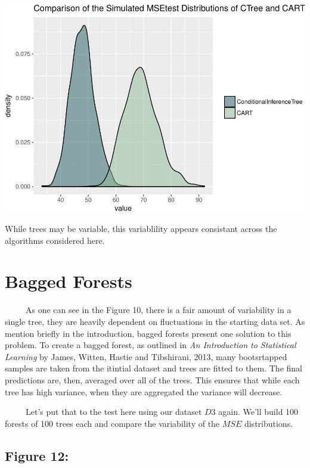\documentclass[12pt,twoside]{reedthesis}
\begin{document}
  \begin{center}\includegraphics{Thesis_files/figure-latex/fig11-1} \end{center}
  
  While trees may be variable, this variablility appears consistant across
  the algorithms considered here.
  
  \section{Bagged Forests}\label{bagged-forests}
  
  ~~~~~As one can see in the Figure 10, there is a fair amount of
  variability in a single tree, they are heavily dependent on fluctuations
  in the starting data set. As mention briefly in the introduction, bagged
  forests present one solution to this problem. To create a bagged forest,
  as outlined in \emph{An Introduction to Statistical Learning} by James,
  Witten, Hastie and Tibshirani, 2013, many bootsrtapped samples are taken
  from the itintial dataset and trees are fitted to them. The final
  predictions are, then, averaged over all of the trees. This ensures that
  while each tree has high variance, when they are aggregated the variance
  will decrease.
  
  ~~~~~Let's put that to the test here using our dataset \(D3\) again.
  We'll build 100 forests of 100 trees each and compare the variability of
  the \(MSE\) distributions.
  
  \subsection{Figure 12:}\label{figure-12}
  
\end{document}
